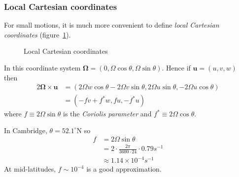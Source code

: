 \documentclass{jknotes}
\begin{document}
\subsubsection{Local Cartesian coordinates}
For small motions, it is much more convenient to define \emph{local Cartesian
coordinates} (figure~\ref{fig:lcc}).
\begin{figure}
	\begin{center}
	\caption{Local Cartesian coordinates}
	\label{fig:lcc}
	\end{center}
\end{figure}

In this coordinate system $\symbf{\Omega} = (0, \Omega \cos \theta, \Omega \sin
\theta)$. Hence if $\symbf{u} = (u, v, w)$ then
\begin{equation}
	\begin{aligned}
		2 \symbf{\Omega} \times \symbf{u} &= (2\Omega w \cos \theta - 2 \Omega v \sin
		\theta, 2 \Omega u \sin \theta, -2\Omega u \cos \theta) \\
		&= (-fv + f^* w, fu, -f^* u)
	\end{aligned}
\end{equation}
where $f \equiv 2 \Omega \sin \theta$ is the \emph{Coriolis parameter} and
$f^* \equiv 2 \Omega \cos \theta$.

\begin{eg}
	In Cambridge, $\theta = 52.1^{\circ}$N so
	\begin{equation}
		\begin{aligned}
			f &= 2 \Omega \sin \theta \\
			  &= 2 \cdot \frac{2\pi}{3600 \cdot 24} \cdot 0.79 s^{-1} \\
			  &\approx 1.14 \times 10^{-4} s^{-1}
		\end{aligned}
	\end{equation}
	At mid-latitudes, $f \sim 10^{-4}$ is a good approximation.
\end{eg}
\end{document}
